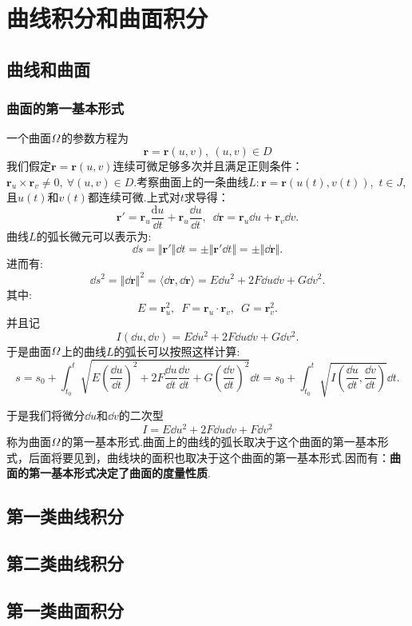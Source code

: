 \chapter{曲线积分和曲面积分}
\section{曲线和曲面}
    \subsection{曲面的第一基本形式}
    一个曲面\(\mit\Omega\)的参数方程为\[\bm{r}=\bm{r}(u,v),\ (u,v)\in D\]
    我们假定\(\bm{r}=\bm{r}(u,v)\)连续可微足够多次并且满足正则条件：\(\bm{r}_u\times\bm{r}_v\neq0,\ \forall(u,v)\in D\).考察曲面上的一条曲线\(L: \bm{r}=\bm{r}(u(t),v(t))\),\ \(t\in J\),且\(u(t)\)和\(v(t)\)都连续可微.上式对\(t\)求导得：
    \[\bm{r}'=\bm{r}_u\frac{\mathrm{d}u}{\dd t}+\bm{r}_u\frac{\dd u}{\dd t},\enspace\dd\bm{r}=\bm{r}_u\dd u+\bm{r}_v\dd v.\]
    曲线\(L\)的弧长微元可以表示为:\[\dd s=\Vert\bm{r}'\Vert\dd t=\pm\Vert\bm{r}'\dd t\Vert=\pm\Vert\dd\bm{r}\Vert.\]
    进而有:\[\dd s^2=\Vert\dd\bm{r}\Vert^2=\langle\dd\bm{r},\dd\bm{r}\rangle=E\dd u^2+2F\dd u\dd v+G\dd v^2.\]
    其中:\[E=\bm{r}_u^2,\enspace F=\bm{r}_u\cdot\bm{r}_v,\enspace G=\bm{r}_v^2.\]
    并且记\[I(\dd u,\dd v)=E\dd u^2+2F\dd u\dd v+G\dd v^2.\]
    于是曲面\(\mit\Omega\)上的曲线\(L\)的弧长可以按照这样计算:\[s=s_0+\int_{t_0}^{t}\sqrt{E\left(\frac{\dd u}{\dd t}\right)^2+2F\frac{\dd u}{\dd t}\frac{\dd v}{\dd t}+G\left(\frac{\dd v}{\dd t}\right)^2}\dd t=s_0+\int_{t_0}^{t}\sqrt{I\left(\frac{\dd u}{\dd t},\frac{\dd v}{\dd t}\right)}\dd t.\]

    于是我们将微分\(\dd u\)和\(\dd v\)的二次型\[I=E\dd u^2+2F\dd u\dd v+F\dd v^2\]称为曲面\(\mit\Omega\)的第一基本形式.曲面上的曲线的弧长取决于这个曲面的第一基本形式，后面将要见到，曲线块的面积也取决于这个曲面的第一基本形式.因而有：\textbf{曲面的第一基本形式决定了曲面的度量性质}.
    
\section{第一类曲线积分}
\section{第二类曲线积分}
\section{第一类曲面积分}
